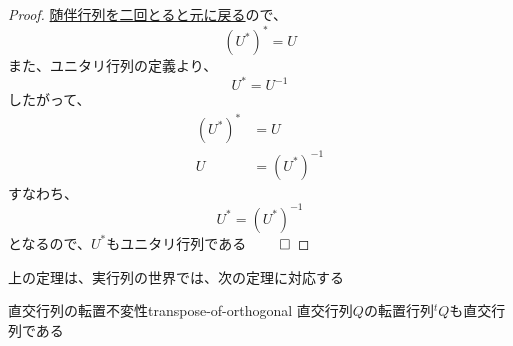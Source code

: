 \documentclass[../../../topic_linear-algebra]{subfiles}
\begin{document}
\begin{proof}
  \hyperref[thm:adjoint-involution]{随伴行列を二回とると元に戻る}ので、
  \begin{equation*}
    (U^*)^* = U
  \end{equation*}
  また、ユニタリ行列の定義より、
  \begin{equation*}
    U^* = U^{-1}
  \end{equation*}
  したがって、
  \begin{align*}
    (U^*)^* & = U          \\
    U       & = (U^*)^{-1}
  \end{align*}
  すなわち、
  \begin{equation*}
    U^* = (U^*)^{-1}
  \end{equation*}
  となるので、$U^*$もユニタリ行列である $\qed$
\end{proof}

\br

上の定理は、実行列の世界では、次の定理に対応する

\begin{theorem}{直交行列の転置不変性}{transpose-of-orthogonal}
  直交行列$Q$の転置行列${}^tQ$も直交行列である
\end{theorem}
\end{document}
